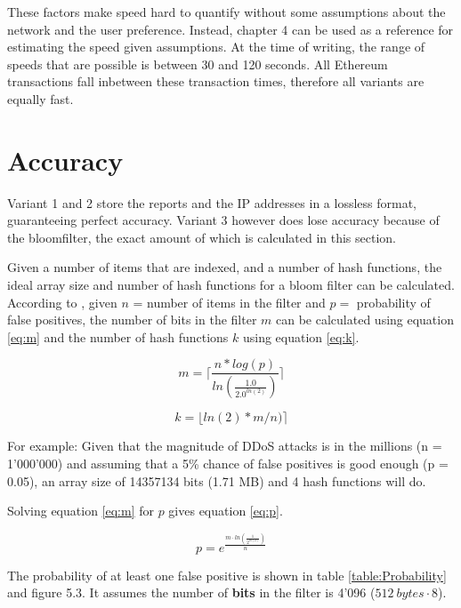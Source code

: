 These factors make speed hard to quantify without some  assumptions about the network and the user preference. Instead, chapter 4 can be used as a reference for estimating the speed given assumptions. At the time of writing, the range of speeds that are possible is between 30 and 120 seconds. All Ethereum transactions fall inbetween these transaction times, therefore all variants are equally fast.

\section{Accuracy}

Variant 1 and 2 store the reports and the IP addresses in a lossless format, guaranteeing perfect accuracy. Variant 3 however does lose accuracy because of the bloomfilter, the exact amount of which is calculated in this section.

Given a number of items that are indexed, and a number of hash functions, the ideal array size and number of hash functions for a bloom filter can be calculated. According to \cite{BloomfilterAccuracy}, given $n$ = number of items in the filter and $p =$ probability of false positives, the number of bits in the filter $m$ can be calculated using equation \ref{eq:m} and the number of hash functions $k$ using equation \ref{eq:k}. 

\begin{equation}
m = \lceil\frac{n * log(p)}{ln(\frac{1.0}{2.0 ^{ln(2)}})}\rceil
\label{eq:m}
\end{equation}

\begin{equation}
k = \lfloor ln(2) * m / n) \rceil
\label{eq:k}
\end{equation}

For example: Given that the magnitude of DDoS attacks is in the millions (n = 1'000'000) and assuming that a 5\% chance of false positives is good enough (p = 0.05), an array size of 14357134 bits (1.71 MB) and 4 hash functions will do.

Solving equation \ref{eq:m} for $p$ gives equation \ref{eq:p}.

\begin{equation}
p = e^{\frac{{m \cdot ln(\frac{1}{2^{ln(2)}})}}{n}}
\label{eq:p}
\end{equation}

The probability of at least one false positive is shown in table \ref{table:Probability} and figure 5.3. It assumes the number of \textbf{bits} in the filter is 4'096 ($512\ bytes \cdot 8$).

